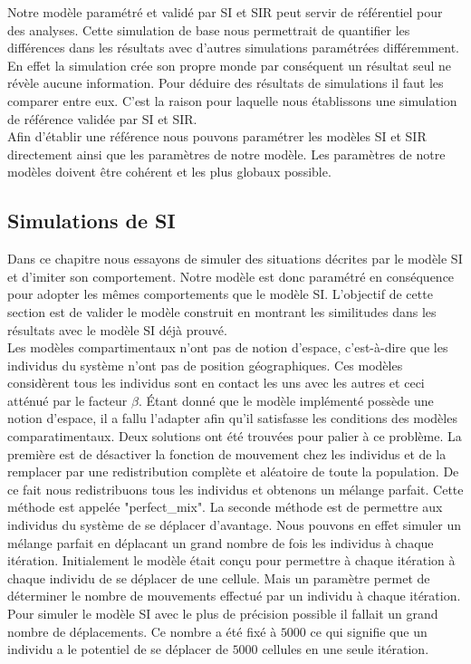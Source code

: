 Notre modèle paramétré et validé par SI et SIR peut servir de référentiel pour des analyses. Cette simulation de base nous permettrait de quantifier les différences dans les résultats avec d'autres simulations paramétrées différemment. En effet la simulation crée son propre monde par conséquent un résultat seul ne révèle aucune information. Pour déduire des résultats de simulations il faut les comparer entre eux. C'est la raison pour laquelle nous établissons une simulation de référence validée par SI et SIR.\\

Afin d'établir une référence nous pouvons paramétrer les modèles SI et SIR directement ainsi que les paramètres de notre modèle. Les paramètres de notre modèles doivent être cohérent et les plus globaux possible.\\

\subsection{Simulations de SI}

Dans ce chapitre nous essayons de simuler des situations décrites par le modèle SI et d'imiter son comportement. Notre modèle est donc paramétré en conséquence pour adopter les mêmes comportements que le modèle SI. L'objectif de cette section est de valider le modèle construit en montrant les similitudes dans les résultats avec le modèle SI déjà prouvé. \\

Les modèles compartimentaux n'ont pas de notion d'espace, c'est-à-dire que les individus du système n'ont pas de position géographiques. Ces modèles considèrent tous les individus sont en contact les uns avec les autres et ceci atténué par le facteur $\beta$. Étant donné que le modèle implémenté possède une notion d'espace, il a fallu l'adapter afin qu'il satisfasse les conditions des modèles comparatimentaux. Deux solutions ont été trouvées pour palier à ce problème. La première est de désactiver la fonction de mouvement chez les individus et de la remplacer par une redistribution complète et aléatoire de toute la population. De ce fait nous redistribuons tous les individus et obtenons un mélange parfait. Cette méthode est appelée "perfect\_mix". La seconde méthode est de permettre aux individus du système de se déplacer d'avantage. Nous pouvons en effet simuler un mélange parfait en déplacant un grand nombre de fois les individus à chaque itération. Initialement le modèle était conçu pour permettre à chaque itération à chaque individu de se déplacer de une cellule. Mais un paramètre permet de déterminer le nombre de mouvements effectué par un individu à chaque itération. Pour simuler le modèle SI avec le plus de précision possible il fallait un grand nombre de déplacements. Ce nombre a été fixé à $5000$ ce qui signifie que un individu a le potentiel de se déplacer de $5000$ cellules en une seule itération.\\

